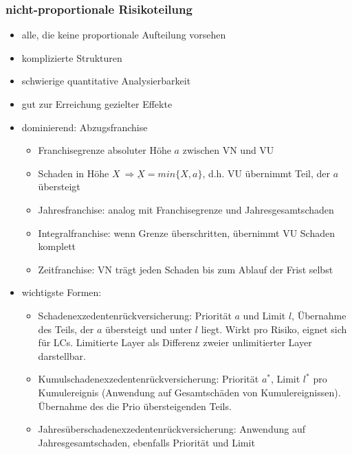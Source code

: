 \documentclass[12pt]{report}
\theoremstyle{dotless}
\theoremstyle{definition}
\begin{document}
\subsubsection{nicht-proportionale Risikoteilung}
\begin{itemize}
	\item alle, die keine proportionale Aufteilung vorsehen
	\item komplizierte Strukturen
	\item schwierige quantitative Analysierbarkeit
	\item gut zur Erreichung gezielter Effekte
	\item dominierend: Abzugsfranchise
		\begin{itemize}
			\item Franchisegrenze absoluter Höhe $a$ zwischen VN und VU
			\item Schaden in Höhe $X \ \Rightarrow \underbar{X}=min\{X,a\}$, d.h. VU übernimmt Teil, der $a$ übersteigt
			\item Jahresfranchise: analog mit Franchisegrenze und Jahresgesamtschaden
			\item Integralfranchise: wenn Grenze überschritten, übernimmt VU Schaden komplett
			\item Zeitfranchise: VN trägt jeden Schaden bis zum Ablauf der Frist selbst
		\end{itemize}
	\item wichtigste Formen: 
		\begin{itemize}
			\item Schadenexzedentenrückversicherung: Priorität $a$ und Limit $l$, Übernahme des Teils, der $a$ übersteigt und unter $l$ liegt. Wirkt pro Risiko, eignet sich für LCs. Limitierte Layer als Differenz zweier unlimitierter Layer darstellbar. 
			\item Kumulschadenexzedentenrückversicherung: Priorität $a^*$, Limit $l^*$ pro Kumulereignis (Anwendung auf Gesamtschäden von Kumulereignissen). Übernahme des die Prio übersteigenden Teils.
			\item Jahresüberschadenexzedentenrückversicherung: Anwendung auf Jahresgesamtschaden, ebenfalls Priorität und Limit
		\end{itemize}	
\end{itemize}
\end{document}
